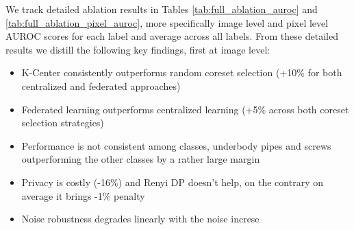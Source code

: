 \documentclass{article}
\begin{document}
\begin{table}[htbp]
\centering
{}
\caption{Pixel-level ROC AUC across all ablations.}
\label{tab:full_ablation_pixel_auroc}
\end{table}

\FloatBarrier

We track detailed ablation results in Tables \ref{tab:full_ablation_auroc} and \ref{tab:full_ablation_pixel_auroc}, more specifically image level and pixel level AUROC scores for each label and average across all labels. From these detailed results we distill the following key findings, first at image level:
\begin{itemize}
	\item K-Center consistently outperforms random coreset selection (+10\% for both centralized and federated approaches)
	\item Federated learning outperforms centralized learning (+5\% across both coreset selection strategies)
	\item Performance is not consistent among classes, underbody pipes and screws outperforming the other classes by a rather large margin
	\item Privacy is costly (-16\%) and Renyi DP doesn't help, on the contrary on average it brings -1\% penalty
	\item Noise robustness degrades linearly with the noise increse
\end{itemize}
\end{document}
